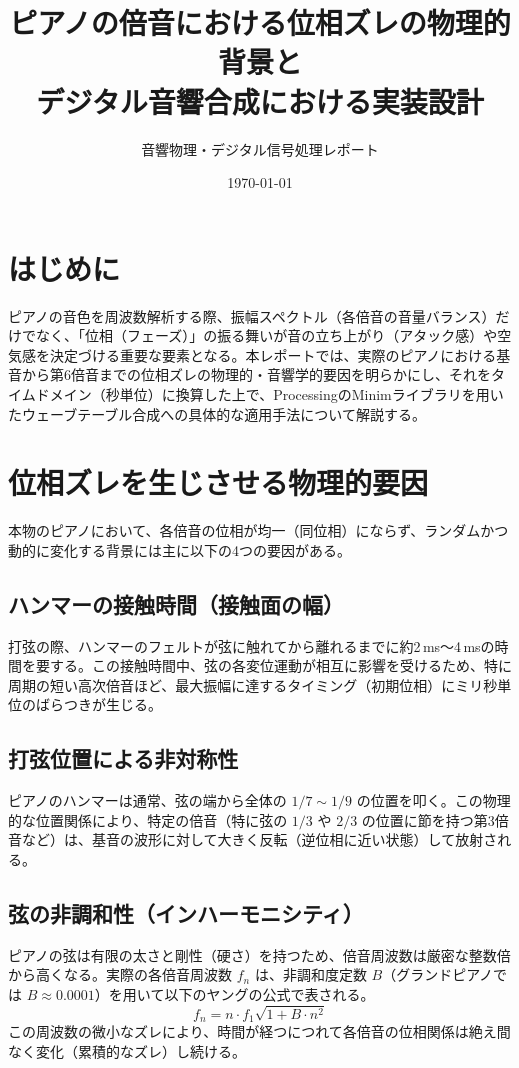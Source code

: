 \documentclass[uplatex,dvipdfmx]{jlreq}
\begin{document}
\title{ピアノの倍音における位相ズレの物理的背景と\\デジタル音響合成における実装設計}
\author{音響物理・デジタル信号処理レポート}
\date{\today}

\maketitle

\section{はじめに}
ピアノの音色を周波数解析する際、振幅スペクトル（各倍音の音量バランス）だけでなく、「位相（フェーズ）」の振る舞いが音の立ち上がり（アタック感）や空気感を決定づける重要な要素となる。本レポートでは、実際のピアノにおける基音から第6倍音までの位相ズレの物理的・音響学的要因を明らかにし、それをタイムドメイン（秒単位）に換算した上で、ProcessingのMinimライブラリを用いたウェーブテーブル合成への具体的な適用手法について解説する。

\section{位相ズレを生じさせる物理的要因}
本物のピアノにおいて、各倍音の位相が均一（同位相）にならず、ランダムかつ動的に変化する背景には主に以下の4つの要因がある。

\subsection{ハンマーの接触時間（接触面の幅）}
打弦の際、ハンマーのフェルトが弦に触れてから離れるまでに約2\,ms〜4\,msの時間を要する。この接触時間中、弦の各変位運動が相互に影響を受けるため、特に周期の短い高次倍音ほど、最大振幅に達するタイミング（初期位相）にミリ秒単位のばらつきが生じる。

\subsection{打弦位置による非対称性}
ピアノのハンマーは通常、弦の端から全体の $1/7 \sim 1/9$ の位置を叩く。この物理的な位置関係により、特定の倍音（特に弦の $1/3$ や $2/3$ の位置に節を持つ第3倍音など）は、基音の波形に対して大きく反転（逆位相に近い状態）して放射される。

\subsection{弦の非調和性（インハーモニシティ）}
ピアノの弦は有限の太さと剛性（硬さ）を持つため、倍音周波数は厳密な整数倍から高くなる。実際の各倍音周波数 $f_n$ は、非調和度定数 $B$（グランドピアノでは $B \approx 0.0001$）を用いて以下のヤングの公式で表される。
\begin{equation}
f_n = n \cdot f_1 \sqrt{1 + B \cdot n^2}
\end{equation}
この周波数の微小なズレにより、時間が経つにつれて各倍音の位相関係は絶え間なく変化（累積的なズレ）し続ける。
\end{document}
